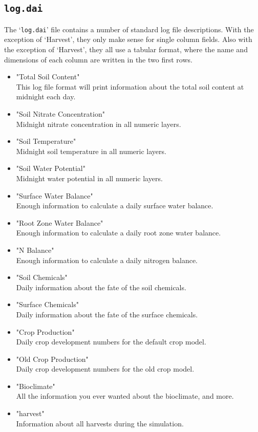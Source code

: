 \subsection{\texttt{log.dai}}

The `\texttt{log.dai}' file contains a number of standard log file
descriptions.  With the exception of `Harvest', they only make sense
for single column fields.  Also with the exception of `Harvest', they
all use a tabular format, where the name and dimensions of each column
are written in the two first rows.

\begin{itemize}
\item "Total Soil Content"\\
  This log file format will print information about the total soil
  content at midnight each day. 
\item "Soil Nitrate Concentration"\\
  Midnight nitrate concentration in all numeric layers.
\item "Soil Temperature"\\
  Midnight soil temperature in all numeric layers.
\item "Soil Water Potential"\\
  Midnight water potential in all numeric layers.
\item "Surface Water Balance"\\
  Enough information to calculate a daily surface water balance. 
\item "Root Zone Water Balance"\\
  Enough information to calculate a daily root zone water balance. 
\item "N Balance"\\
  Enough information to calculate a daily nitrogen balance. 
\item "Soil Chemicals"\\
  Daily information about the fate of the soil chemicals.
\item "Surface Chemicals"\\
  Daily information about the fate of the surface chemicals.
\item "Crop Production"\\
  Daily crop development numbers for the default crop model.
\item "Old Crop Production"\\
  Daily crop development numbers for the old crop model.
\item "Bioclimate"\\
  All the information you ever wanted about the bioclimate, and more. 
\item "harvest"\\
  Information about all harvests during the simulation. 
\end{itemize}

